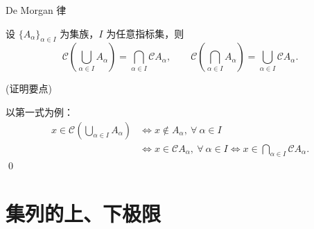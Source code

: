 
\begin{frame}{De Morgan 律}

\begin{thm}[De Morgan 律]
设 $\{A_\alpha\}_{\alpha \in I}$ 为集族，$I$ 为\alert{任意}指标集，则
\[
\mathscr{C}\!\left(\bigcup_{\alpha \in I} A_\alpha\right) = \bigcap_{\alpha \in I} \mathscr{C} A_\alpha,
\qquad
\mathscr{C}\!\left(\bigcap_{\alpha \in I} A_\alpha\right) = \bigcup_{\alpha \in I} \mathscr{C} A_\alpha.
\]
\end{thm}

\pause

\startproof[bg=yellow, fg=red](证明要点)

\vspace{0.3em}
以第一式为例：
\begin{align*}
x \in \mathscr{C}\!\left(\bigcup_{\alpha \in I} A_\alpha\right)
& \iff x \notin A_\alpha,\ \forall ~ \alpha \in I \\
& \iff x \in \mathscr{C} A_\alpha,\ \forall ~ \alpha \in I
\iff x \in \bigcap_{\alpha \in I} \mathscr{C} A_\alpha.
\end{align*}
\qed

\end{frame}


\section[上下极限]{集列的上、下极限}



